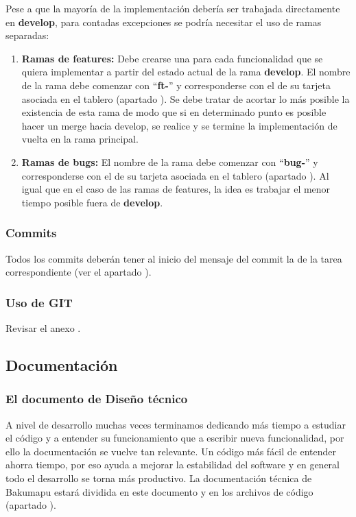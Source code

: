 Pese a que la mayoría de la implementación debería ser trabajada directamente en \textbf{develop}, para contadas excepciones se podría necesitar el uso de ramas separadas:

\begin{enumerate}
	\renewcommand{\labelenumi}{\alph{enumi}.}
	\item \textbf{Ramas de features:} Debe crearse una para cada funcionalidad que se quiera implementar a partir del estado actual de la rama \textbf{develop}. El nombre de la rama debe comenzar con “\textbf{ft-}” y corresponderse con el de su tarjeta asociada en el tablero (apartado ). Se debe tratar de acortar lo más posible la existencia de esta rama de modo que si en determinado punto es posible hacer un merge hacia develop, se realice y se termine la implementación de vuelta en la rama principal.
	
	\item \textbf{Ramas de bugs:} El nombre de la rama debe comenzar con “\textbf{bug-}” y corresponderse con el de su tarjeta asociada en el tablero (apartado ). Al igual que en el caso de las ramas de features, la idea es trabajar el menor tiempo posible fuera de \textbf{develop}.
\end{enumerate}

\subsubsection{Commits}
Todos los commits deberán tener al inicio del mensaje del commit la  de la tarea correspondiente (ver el apartado ).

\subsubsection{Uso de GIT}
Revisar el anexo .


\subsection{Documentación}\label{flujo:documentacion}

\subsubsection{El documento de Diseño técnico}\label{flujo:documento-de-diseno}
A nivel de desarrollo muchas veces terminamos dedicando más tiempo a estudiar el código y a entender su funcionamiento que a escribir nueva funcionalidad, por ello la documentación se vuelve tan relevante. Un código más fácil de entender ahorra tiempo, por eso ayuda a mejorar la estabilidad del software y en general todo el desarrollo se torna más productivo. La documentación técnica de Bakumapu estará dividida en este documento y en los archivos de código (apartado ).

